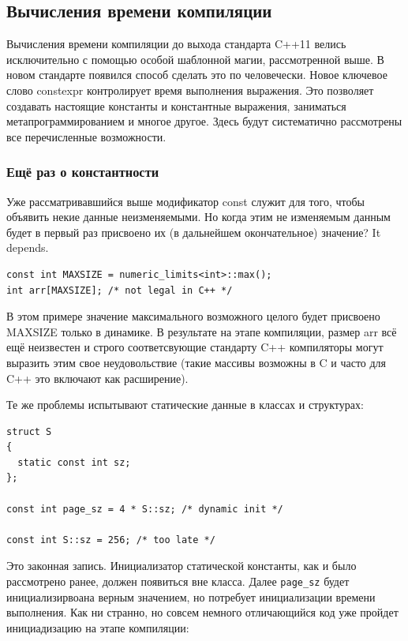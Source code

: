 \documentclass[a4paper,12pt,oneside]{article}
\begin{document}
\subsection{Вычисления времени компиляции}

Вычисления времени компиляции до выхода стандарта C++11 велись исключительно с помощью особой шаблонной магии, рассмотренной выше. В новом стандарте появился способ сделать это по человечески. Новое ключевое слово constexpr контролирует время выполнения выражения. Это позволяет создавать настоящие константы и константные выражения, заниматься метапрограммированием и многое другое. Здесь будут систематично рассмотрены все перечисленные возможности.

\subsubsection{Ещё раз о константности}

Уже рассматривавшийся выше модификатор const служит для того, чтобы объявить некие данные неизменяемыми. Но когда этим не изменяемым данным будет в первый раз присвоено их (в дальнейшем окончательное) значение? It depends.

\begin{lstlisting}
const int MAXSIZE = numeric_limits<int>::max();
int arr[MAXSIZE]; /* not legal in C++ */
\end{lstlisting}

В этом примере значение максимального возможного целого будет присвоено MAXSIZE только в динамике. В результате на этапе компиляции, размер arr всё ещё неизвестен и строго соответсвующие стандарту C++ компиляторы могут выразить этим свое неудовольствие (такие массивы возможны в C и часто для C++ это включают как расширение).

Те же проблемы испытывают статические данные в классах и структурах:

\begin{lstlisting}
struct S 
{
  static const int sz;
};

const int page_sz = 4 * S::sz; /* dynamic init */

const int S::sz = 256; /* too late */
\end{lstlisting}

Это законная запись. Инициализатор статической константы, как и было рассмотрено ранее, должен появиться вне класса. Далее \lstinline!page_sz! будет инициализирвоана верным значением, но потребует инициализации времени выполнения. Как ни странно, но совсем немного отличающийся код уже пройдет инициадизацию на этапе компиляции:
\end{document}
